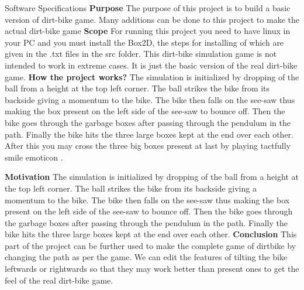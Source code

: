\documentclass[12pt]{beamer}
\begin{document}
\begin{frame}{Software Specifications}
\color{blue}
\textbf{Purpose}\newline
\color{black}
The purpose of this project is to build a basic version of dirt-bike game. Many additions can be done to this project to make the actual dirt-bike game
\newline
\newline
\color{blue}
\textbf{Scope}\newline
\color{black}
For running this project you need to have linux in your PC and you must install the Box2D, the steps for installing of which are given in the .txt files in the src folder. This dirt-bike simulation game is not intended to work in extreme cases. It is just the basic version of the real dirt-bike game.
\newline
\newline
\color{blue}
\textbf{How the project works?}\newline
\color{black}
The simulation is initialized by dropping of the ball from a height at the top left corner. The ball strikes the bike from its backside giving a momentum to the bike. The bike then falls on the see-saw thus making the box present on the left side of the see-saw to bounce off. Then the bike goes through the garbage boxes after passing through the pendulum in the path. Finally the bike hits the three large boxes kept at the end over each other. After this you may cross the three big boxes present at last by playing tactfully smile emoticon .
\newline
\newline
\end{frame}
\begin{frame}{}
\color{red}
\textbf{Motivation} \newline
\color{black} 
The simulation is initialized by dropping of the ball from a height at the top left corner. The ball strikes the bike from its backside giving a momentum to the bike. The bike then falls on the see-saw thus making the box present on the left side of the see-saw to bounce off. Then the bike goes through the garbage boxes after passing through the pendulum in the path. Finally the bike hits the three large boxes kept at the end over each other.\newline
\color{red}
\textbf{Conclusion}  \newline
\color{black} 
This part of the project can be further used to make the complete game of dirtbike by changing the path as per the game. We can edit the features of tilting the bike leftwards or rightwards so that they may work better than present ones to get the feel of the real dirt-bike game.

\end{frame}
\end{document}
